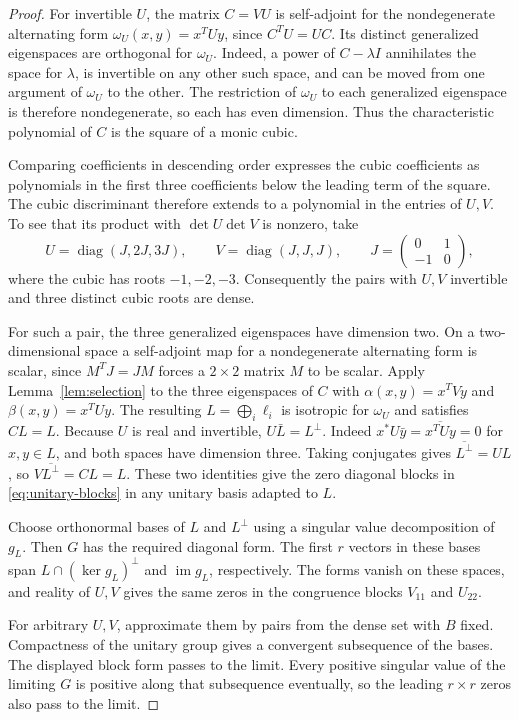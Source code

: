 \documentclass[11pt,letterpaper]{article}
\newcommand{\diag}{\operatorname{diag}}
\begin{document}
\begin{proof}
For invertible \(U\), the matrix \(C=VU\) is self-adjoint for the
nondegenerate alternating form \(\omega_U(x,y)=x^TUy\), since
\(C^TU=UC\). Its distinct generalized eigenspaces are orthogonal
for \(\omega_U\). Indeed, a power of \(C-\lambda I\) annihilates
the space for \(\lambda\), is invertible on any other such space,
and can be moved from one argument of \(\omega_U\) to the other.
The restriction of \(\omega_U\) to each generalized eigenspace
is therefore nondegenerate, so each has even dimension. Thus the
characteristic polynomial of \(C\) is the square of a monic cubic.

Comparing coefficients in descending order expresses the cubic
coefficients as polynomials in the first three coefficients below
the leading term of the square. The cubic discriminant therefore
extends to a polynomial in the entries of \(U,V\). To see that
its product with \(\det U\det V\) is nonzero, take
\[
U=\diag(J,2J,3J),\qquad V=\diag(J,J,J),\qquad
J=\begin{pmatrix}0&1\\-1&0\end{pmatrix},
\]
where the cubic has roots \(-1,-2,-3\). Consequently the pairs
with \(U,V\) invertible and three distinct cubic roots are dense.

For such a pair, the three generalized eigenspaces have dimension
two. On a two-dimensional space a self-adjoint map for a
nondegenerate alternating form is scalar, since
\(M^TJ=JM\) forces a \(2\times2\) matrix \(M\) to be scalar.
Apply Lemma~\ref{lem:selection} to the three eigenspaces of \(C\)
with \(\alpha(x,y)=x^TVy\) and \(\beta(x,y)=x^TUy\).
The resulting \(L=\bigoplus_i\ell_i\) is isotropic for \(\omega_U\)
and satisfies \(CL=L\).
Because \(U\) is real and invertible, \(U\bar L=L^\perp\).
Indeed \(x^*U\bar y=\overline{x^TUy}=0\) for \(x,y\in L\),
and both spaces have dimension three. Taking conjugates gives
\(\overline{L^\perp}=UL\), so \(V\overline{L^\perp}=CL=L\).
These two identities give the zero diagonal blocks in
\eqref{eq:unitary-blocks} in any unitary basis adapted to \(L\).

Choose orthonormal bases of \(L\) and \(L^\perp\) using a singular
value decomposition of \(g_L\). Then \(G\) has the required diagonal
form. The first \(r\) vectors in these bases span
\(L\cap(\ker g_L)^\perp\) and \(\operatorname{im}g_L\), respectively.
The forms vanish on these spaces, and reality of \(U,V\) gives the
same zeros in the congruence blocks \(V_{11}\) and \(U_{22}\).

For arbitrary \(U,V\), approximate them by pairs from the dense set
with \(B\) fixed. Compactness of the unitary group gives a convergent
subsequence of the bases. The displayed block form passes to the
limit. Every positive singular value of the limiting \(G\) is
positive along that subsequence eventually, so the leading
\(r\times r\) zeros also pass to the limit.
\end{proof}
\end{document}
